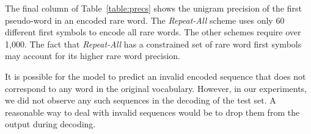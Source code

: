 The final column of Table~\ref{table:precs} shows the unigram precision of the
first pseudo-word in an encoded rare word. The \emph{Repeat-All} scheme uses
only 60 different first symbols to encode all rare words. The other schemes
require over 1,000. The fact that \emph{Repeat-All} has a constrained set of
rare word first symbols may account for its higher rare word precision.

It is possible for the model to predict an invalid encoded sequence that does
not correspond to any word in the original vocabulary. However, in our
experiments, we did not observe any such sequences in the decoding of the
test set. A reasonable way to deal with invalid sequences would be to drop them
from the output during decoding.

